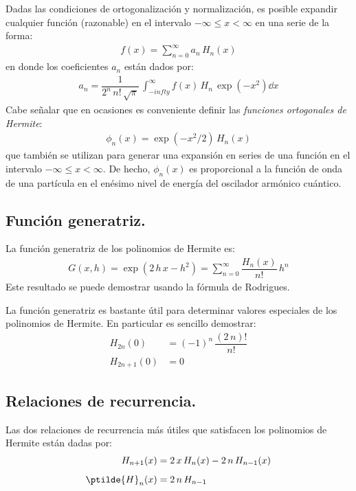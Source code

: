 Dadas las condiciones de ortogonalización y normalización, es posible expandir cualquier función (razonable) en el intervalo $-\infty \leq x < \infty$ en una serie de la forma:
\begin{align*}
f(x) = \sum_{n=0}^{\infty} a_{n} \, H_{n} (x)
\end{align*}
en donde los coeficientes $a_{n}$ están dados por:
\begin{align*}
a_{n} = \dfrac{1}{2^{n} \, n! \, \sqrt{\pi}} \, \int_{-infty}^{\infty} f(x) \, H_{n} \, \exp(-x^{2}) \dd{x}
\end{align*}
Cabe señalar que en ocasiones es conveniente definir las \emph{funciones ortogonales de Hermite}:
\begin{align*}
\phi_{n} (x) = \exp(-x^{2}/2) \, H_{n} (x) 
\end{align*}
que también se utilizan para generar una expansión en series de una función en el intervalo $-\infty \leq x < \infty$. De hecho, $\phi_{n}(x)$ es proporcional a la función de onda de una partícula en el enésimo nivel de energía del oscilador armónico cuántico.

\subsection{Función generatriz.}

La función generatriz de los polinomios de Hermite es:
\begin{align}
G(x, h) = \exp(2 \, h \, x - h^{2}) = \sum_{n=0}^{\infty} \dfrac{H_{n}(x)}{n!} \, h^{n}
\label{eq:ecuacion_18_133}
\end{align}
Este resultado se puede demostrar usando la fórmula de Rodrigues.
\par
La función generatriz es bastante útil para determinar valores especiales de los polinomios de Hermite. En particular es sencillo demostrar:
\begin{align*}
H_{2n}(0) &= (-1)^{n} \, \dfrac{(2 \, n)!}{n!} \\[0.5em]
H_{2n+1}(0) &= 0
\end{align*}

\subsection{Relaciones de recurrencia.}

Las dos relaciones de recurrencia más útiles que satisfacen los polinomios de Hermite están dadas por:
\begin{align}
H_{n+1} (x) &= 2 \, x \, H_{n}(x) -  2 \, n \, H_{n-1}(x) \label{eq:ecuacion_12_134} \\[0.5em]
\ptilde{H}_{n}(x) &= 2 \, n \, H_{n-1} \label{eq:ecuacion_18_135}
\end{align}
